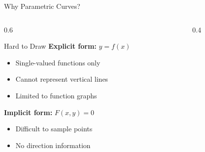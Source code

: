 \begin{frame}{Why Parametric Curves?}
  \begin{columns}
    \begin{column}{0.6\textwidth}
      \begin{conceptbox}{Hard to Draw}
        \scriptsize
        \textbf{Explicit form:} $y = f(x)$
        \begin{itemize}
          \item Single-valued functions only
          \item Cannot represent vertical lines
          \item Limited to function graphs
        \end{itemize}

        \vspace{0.3cm}
        \textbf{Implicit form:} $F(x,y) = 0$
        \begin{itemize}
          \item Difficult to sample points
          \item No direction information
        \end{itemize}
      \end{conceptbox}
    \end{column}
    \begin{column}{0.4\textwidth}
      \begin{center}
      \end{center}
    \end{column}
  \end{columns}
\end{frame}

